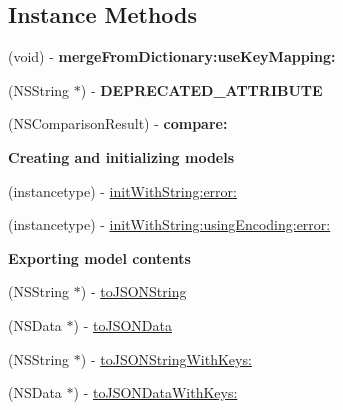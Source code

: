 \subsection*{Instance Methods}
\begin{DoxyCompactItemize}
\item 
\mbox{\label{interface_o_p_t_l_y_j_s_o_n_model_af492404f6c3eb4ad3917fd3fa42bdc22}} 
(void) -\/ {\bfseries merge\+From\+Dictionary\+:use\+Key\+Mapping\+:}
\item 
\mbox{\label{interface_o_p_t_l_y_j_s_o_n_model_a37ff00b4f8f6aea4b23bca04d3f61eaa}} 
(N\+S\+String $\ast$) -\/ {\bfseries D\+E\+P\+R\+E\+C\+A\+T\+E\+D\+\_\+\+A\+T\+T\+R\+I\+B\+U\+TE}
\item 
\mbox{\label{interface_o_p_t_l_y_j_s_o_n_model_a7c781cd2455aa4eea748637a151b46cb}} 
(N\+S\+Comparison\+Result) -\/ {\bfseries compare\+:}
\end{DoxyCompactItemize}
\begin{Indent}\textbf{ Creating and initializing models}\par
\begin{DoxyCompactItemize}
\item 
(instancetype) -\/ \mbox{\hyperlink{interface_o_p_t_l_y_j_s_o_n_model_a1f1a61cd0197acd5306284ca658cbbf5}{init\+With\+String\+:error\+:}}
\item 
(instancetype) -\/ \mbox{\hyperlink{interface_o_p_t_l_y_j_s_o_n_model_af84f531355d015c8c7e6cbaca8215476}{init\+With\+String\+:using\+Encoding\+:error\+:}}
\end{DoxyCompactItemize}
\end{Indent}
\begin{Indent}\textbf{ Exporting model contents}\par
\begin{DoxyCompactItemize}
\item 
(N\+S\+String $\ast$) -\/ \mbox{\hyperlink{interface_o_p_t_l_y_j_s_o_n_model_a0c49b24832149f756d011e17225cb5b1}{to\+J\+S\+O\+N\+String}}
\item 
(N\+S\+Data $\ast$) -\/ \mbox{\hyperlink{interface_o_p_t_l_y_j_s_o_n_model_a5b08f6a900e32f655981c0c2cbcca3f8}{to\+J\+S\+O\+N\+Data}}
\item 
(N\+S\+String $\ast$) -\/ \mbox{\hyperlink{interface_o_p_t_l_y_j_s_o_n_model_a7877db814d4a807b4fa309e6e4a613ce}{to\+J\+S\+O\+N\+String\+With\+Keys\+:}}
\item 
(N\+S\+Data $\ast$) -\/ \mbox{\hyperlink{interface_o_p_t_l_y_j_s_o_n_model_a55de253c412617cfd23a55b064571e13}{to\+J\+S\+O\+N\+Data\+With\+Keys\+:}}
\end{DoxyCompactItemize}
\end{Indent}
